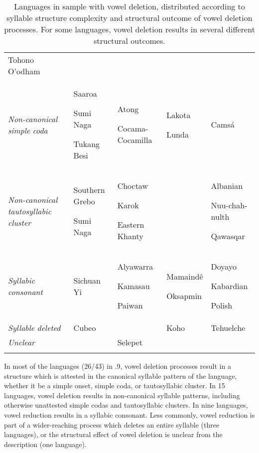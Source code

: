 \begin{table}
\begin{tabularx}{\textwidth}{XXXXX}
Tohono O’odham\\
\textit{Non-canonical} \textit{simple} \textit{coda} & Saaroa

Sumi Naga

Tukang Besi & Atong

Cocama-Cocamilla & Lakota

Lunda & Camsá\\
\textit{Non-canonical} \textit{tautosyllabic} \textit{cluster} & Southern Grebo

Sumi Naga & Choctaw

Karok

Eastern Khanty &  & Albanian

Nuu-chah-nulth

Qawasqar\\
\textit{Syllabic} \textit{consonant} & Sichuan Yi & Alyawarra

Kamasau

Paiwan & Mamaindê

Oksapmin & Doyayo

Kabardian

Polish\\
\textit{Syllable} \textit{deleted} & Cubeo &  & Koho & Tehuelche\\
\textit{Unclear} &  & Selepet &  & \\
\lspbottomrule
\end{tabularx}
\caption{\label{6.9}Languages in sample with vowel deletion, distributed according to syllable structure complexity and structural outcome of vowel deletion processes. For some languages, vowel deletion results in several different structural outcomes.}
\end{table}

  In most of the languages (26/43) in .9, vowel deletion processes result in a structure which is attested in the canonical syllable pattern of the language, whether it be a simple onset, simple coda, or tautosyllabic cluster. In 15 languages, vowel deletion results in non-canonical syllable patterns, including otherwise unattested simple codas and tautosyllabic clusters. In nine languages, vowel reduction results in a syllabic consonant. Less commonly, vowel reduction is part of a wider-reaching process which deletes an entire syllable (three languages), or the structural effect of vowel deletion is unclear from the description (one language).

